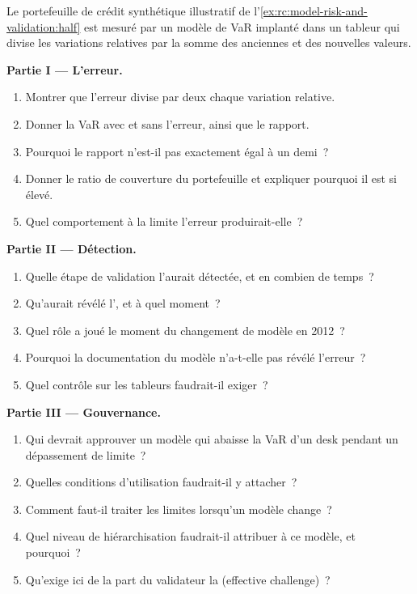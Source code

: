 \begin{problem}\label{pb:rc:model-risk-and-validation:1}
Le portefeuille de crédit synthétique illustratif de l'\cref{ex:rc:model-risk-and-validation:half} est mesuré par un
modèle de VaR implanté dans un tableur qui divise les variations relatives par la somme des anciennes et des nouvelles valeurs.

\medskip\noindent\textbf{Partie I --- L'erreur.}
\begin{enumerate}
\item Montrer que l'erreur divise par deux chaque variation relative.
\item Donner la VaR avec et sans l'erreur, ainsi que le rapport.
\item Pourquoi le rapport n'est-il pas exactement égal à un demi~?
\item Donner le ratio de couverture du portefeuille et expliquer pourquoi il est si élevé.
\item Quel comportement à la limite l'erreur produirait-elle~?
\end{enumerate}

\medskip\noindent\textbf{Partie II --- Détection.}
\begin{enumerate}[resume]
\item Quelle étape de validation l'aurait détectée, et en combien de temps~?
\item Qu'aurait révélé l', et à quel moment~?
\item Quel rôle a joué le moment du changement de modèle en 2012~?
\item Pourquoi la documentation du modèle n'a-t-elle pas révélé l'erreur~?
\item Quel contrôle sur les tableurs faudrait-il exiger~?
\end{enumerate}

\medskip\noindent\textbf{Partie III --- Gouvernance.}
\begin{enumerate}[resume]
\item Qui devrait approuver un modèle qui abaisse la VaR d'un desk pendant un dépassement de limite~?
\item Quelles conditions d'utilisation faudrait-il y attacher~?
\item Comment faut-il traiter les limites lorsqu'un modèle change~?
\item Quel niveau de hiérarchisation faudrait-il attribuer à ce modèle, et pourquoi~?
\item Qu'exige ici de la part du validateur la  (effective challenge)~?
\end{enumerate}


\end{problem}
